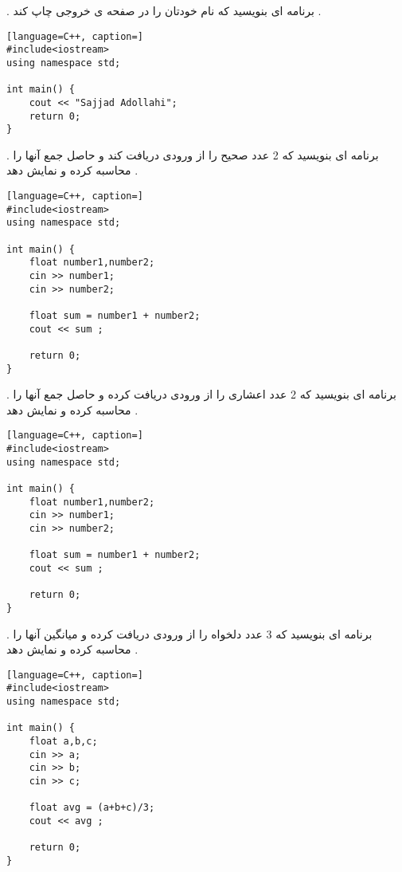 \documentclass[12pt]{article}
\begin{document}
. برنامه ای بنویسید که نام خودتان را در صفحه ی خروجی چاپ کند .


\begin{latin}
\begin{lstlisting}[language=C++, caption=]
#include<iostream>
using namespace std;

int main() {
	cout << "Sajjad Adollahi";
	return 0;
}
\end{lstlisting}
\end{latin}




 . برنامه ای بنویسید که 2 عدد صحیح را از ورودی دریافت کند و حاصل جمع آنها را محاسبه کرده و نمایش دهد .



\begin{latin}
\begin{lstlisting}[language=C++, caption=]
#include<iostream>
using namespace std;

int main() {
	float number1,number2;
	cin >> number1;
	cin >> number2;
	
	float sum = number1 + number2;
	cout << sum ;
	
	return 0;
}
\end{lstlisting}
\end{latin}



\newpage


 . برنامه ای بنویسید که 2 عدد اعشاری را از ورودی دریافت کرده و حاصل جمع آنها را محاسبه کرده و نمایش دهد .




\begin{latin}
\begin{lstlisting}[language=C++, caption=]
#include<iostream>
using namespace std;

int main() {
	float number1,number2;
	cin >> number1;
	cin >> number2;
	
	float sum = number1 + number2;
	cout << sum ;
	
	return 0;
}
\end{lstlisting}
\end{latin}



 . برنامه ای بنویسید که 3 عدد دلخواه را از ورودی دریافت کرده و میانگین آنها را محاسبه کرده و نمایش دهد .



\begin{latin}
\begin{lstlisting}[language=C++, caption=]
#include<iostream>
using namespace std;

int main() {
	float a,b,c;
	cin >> a;
	cin >> b;
	cin >> c;
	
	float avg = (a+b+c)/3;
	cout << avg ;
	
	return 0;
}
\end{lstlisting}
\end{latin}
\end{document}
